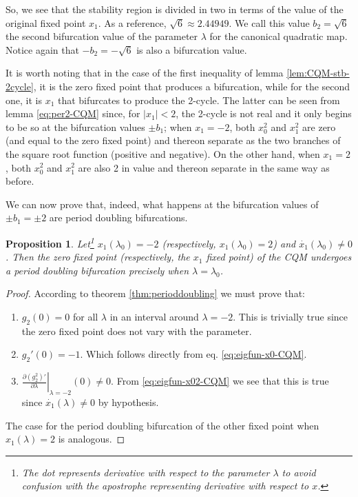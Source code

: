 \documentclass[10pt,twoside,titlepage]{book}
\numberwithin{equation}{chapter}
\numberwithin{figure}{chapter}
\numberwithin{table}{chapter}
\theoremstyle{plain}%
\newtheorem{prop}[thm]{Proposition}
\theoremstyle{definition}
\theoremstyle{remark}
\begin{document}
So, we see that the stability region is divided in two in terms of the value of the original fixed point $x_1$. As a reference, $\sqrt{6}\approx2.44949$. We call this value $b_2=\sqrt{6}$ the second bifurcation value of the parameter $\lambda$ for the canonical quadratic map. Notice again that $-b_2=-\sqrt{6}$ is also a bifurcation value.

It is worth noting that in the case of the first inequality of lemma \ref{lem:CQM-stb-2cycle}, it is the zero fixed point that produces a bifurcation, while for the second one, it is $x_1$ that bifurcates to produce the 2-cycle. The latter can be seen from lemma \ref{eq:per2-CQM} since, for $|x_1|<2$, the 2-cycle is not real and it only begins to be so at the bifurcation values $\pm b_1$; when $x_1=-2$, both $x_0^2$ and $x_1^2$ are zero (and equal to the zero fixed point) and thereon separate as the two branches of the square root function (positive and negative). On the other hand, when $x_1=2$, both $x_0^2$ and $x_1^2$ are also 2 in value and thereon separate in the same way as before.

We can now prove that, indeed, what happens at the bifurcation values of $\pm b_1=\pm2$ are period doubling bifurcations.

\begin{prop}
	\label{prop:CQM-per2bif-b1}
	Let\footnote{The dot represents derivative with respect to the parameter $\lambda$ to avoid confusion with the apostrophe representing derivative with respect to $x$.} $x_1(\lambda_0)=-2$ (respectively, $x_1(\lambda_0)=2$) and $\dot{x_1}(\lambda_0)\neq 0$. Then the zero fixed point (respectively, the $x_1$ fixed point) of the CQM undergoes a period doubling bifurcation precisely when $\lambda=\lambda_0$.
\end{prop}
\begin{proof}
	According to theorem \ref{thm:perioddoubling} we must prove that:
	\begin{enumerate}
		\item $g_2(0)=0$ for all $\lambda$ in an interval around $\lambda=-2$. This is trivially true since the zero fixed point does not vary with the parameter.
		\item $g_2'(0)=-1$. Which follows directly from eq. \ref{eq:eigfun-x0-CQM}.
		\item $\left.\frac{\partial\left(g^2_2\right)'}{\partial\lambda}\right|_{\lambda=-2}(0)\neq 0$. From \eqref{eq:eigfun-x02-CQM} we see that this is true since $\dot{x_1}(\lambda)\neq 0$ by hypothesis.
	\end{enumerate}
	The case for the period doubling bifurcation of the other fixed point when $x_1(\lambda)=2$ is analogous.
\end{proof}
\end{document}
